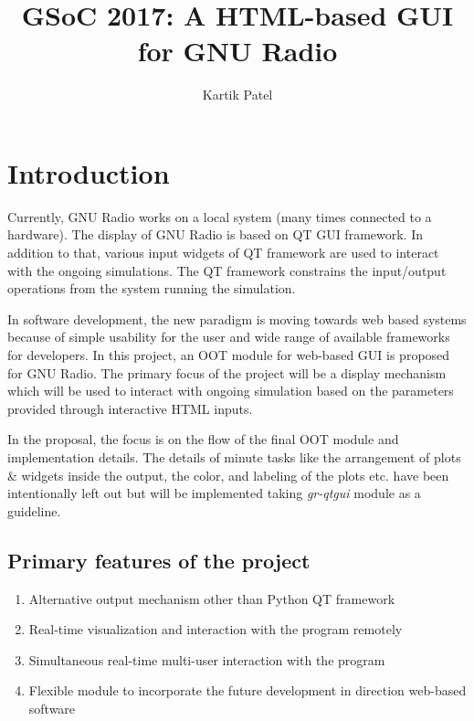 \documentclass[a4paper, 11pt]{article}
\title{GSoC 2017: A HTML-based GUI for GNU Radio}
\author{Kartik Patel}
\begin{document}
\newcommand{\pull}[1]{\href{https://github.com/gnuradio/gnuradio/pull/#1}{\# #1}}



\maketitle

\section{Introduction}
Currently, GNU Radio works on a local system (many times connected to a hardware). The display of GNU Radio is based on QT GUI framework. In addition to that, various input widgets of QT framework are used to interact with the ongoing simulations. The QT framework constrains the input/output operations from the system running the simulation. 

In software development, the new paradigm is moving towards web based systems because of simple usability for the user and wide range of available frameworks for developers. In this project, an OOT module for web-based GUI is proposed for GNU Radio. The primary focus of the project will be a display mechanism which will be used to interact with ongoing simulation based on the parameters provided through interactive HTML inputs.

In the proposal, the focus is on the flow of the final OOT module and implementation details. The details of minute tasks like the arrangement of plots \& widgets inside the output, the color, and labeling of the plots etc. have been intentionally left out but will be implemented taking \textit{gr-qtgui} module as a guideline.

\subsection{Primary features of the project}
\begin{enumerate}
\item Alternative output mechanism other than Python QT framework
\item Real-time visualization and interaction with the program remotely
\item Simultaneous real-time multi-user interaction with the program
\item Flexible module to incorporate the future development in direction web-based software
\end{enumerate}
\end{document}
